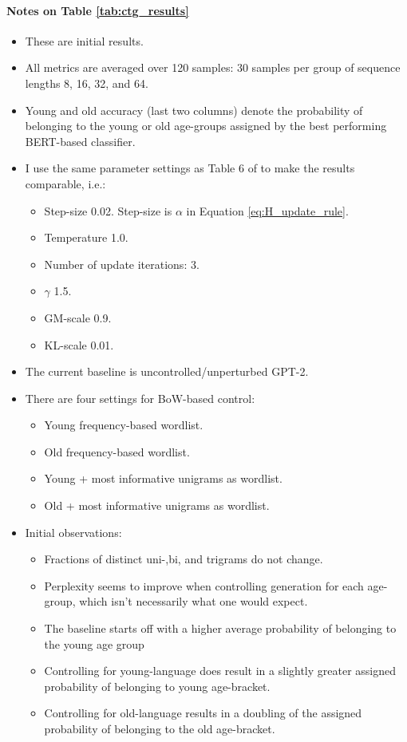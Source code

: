 \paragraph{Notes on Table \ref{tab:ctg_results}}

\begin{itemize}
    \item These are initial results.
    \item All metrics are averaged over 120 samples: 30 samples per group of sequence lengths 8, 16, 32, and 64.
    \item Young and old accuracy (last two columns) denote the probability of belonging to the young or old age-groups assigned by the best performing BERT-based classifier.
    \item I use the same parameter settings as Table 6 of \cite{dathathri2019plug} to make the results comparable, i.e.:
    \begin{itemize}
        \item Step-size 0.02. Step-size is $\alpha$ in Equation \ref{eq:H_update_rule}.
        \item Temperature 1.0.
        \item Number of update iterations: 3.
        \item $\gamma$ 1.5.
        \item GM-scale 0.9.
        \item KL-scale 0.01.
    \end{itemize}
    \item The current baseline is uncontrolled/unperturbed GPT-2.
    \item There are four settings for BoW-based control:
    \begin{itemize}
        \item Young frequency-based wordlist.
        \item Old frequency-based wordlist.
        \item Young + most informative unigrams as wordlist.
        \item Old + most informative unigrams as wordlist.
    \end{itemize}
    \item Initial observations:
    \begin{itemize}
        \item Fractions of distinct uni-,bi, and trigrams do not change.
        \item Perplexity seems to improve when controlling generation for each age-group, which isn't necessarily what one would expect.
        \item The baseline starts off with a higher average probability of belonging to the young age group
        \item Controlling for young-language does result in a slightly greater assigned probability of belonging to young age-bracket.
        \item Controlling for old-language results in a doubling of the assigned probability of belonging to the old age-bracket.
    \end{itemize}
\end{itemize}

